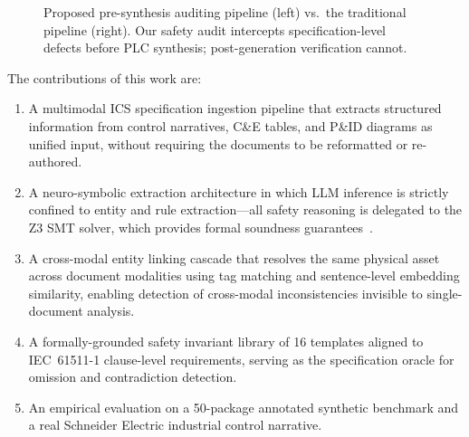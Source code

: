 \documentclass[conference]{IEEEtran}
\begin{document}
\begin{figure}[t]
\centering
{}
\caption{Proposed pre-synthesis auditing pipeline (left) vs.\ the traditional
pipeline (right). Our safety audit intercepts specification-level defects
before PLC synthesis; post-generation verification cannot.}
\label{fig:workflow}
\end{figure}

The contributions of this work are:
\begin{enumerate}
\item A multimodal ICS specification ingestion pipeline that extracts
  structured information from control narratives, C\&E tables, and
  P\&ID diagrams as unified input, without requiring the documents to
  be reformatted or re-authored.
\item A neuro-symbolic extraction architecture in which LLM inference
  is strictly confined to entity and rule extraction---all safety
  reasoning is delegated to the Z3 SMT solver, which provides formal
  soundness guarantees~\cite{moura2008z3}.
\item A cross-modal entity linking cascade that resolves the same
  physical asset across document modalities using tag matching and
  sentence-level embedding similarity, enabling detection of cross-modal
  inconsistencies invisible to single-document analysis.
\item A formally-grounded safety invariant library of 16 templates
  aligned to IEC~61511-1 clause-level requirements, serving as the
  specification oracle for omission and contradiction detection.
\item An empirical evaluation on a 50-package annotated synthetic
  benchmark and a real Schneider Electric industrial control narrative.
\end{enumerate}
\end{document}
